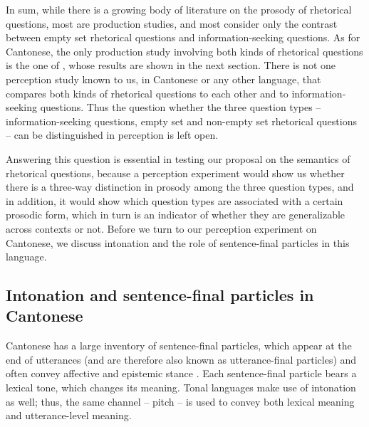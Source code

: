 \documentclass[output=paper,colorlinks,citecolor=brown            ,chinesefont]{langscibook}
\begin{document}
In sum, while there is a growing body of literature on the prosody of rhetorical questions, most are production studies, and most consider only the contrast between empty set rhetorical questions and information-seeking questions. As for Cantonese, the only production study involving both kinds of rhetorical questions is the one of \citet{Lo+2019}, whose results are shown in the next section. There is not one perception study known to us, in Cantonese or any other language, that compares both kinds of rhetorical questions to each other and to information-seeking questions. Thus the question whether the three question types -- information-seeking questions, empty set and non-empty set rhetorical questions -- can be distinguished in perception is left open. 

Answering this question is essential in testing our proposal on the semantics of rhetorical questions, because a perception experiment would show us whether there is a three-way distinction in prosody among the three question types, and in addition, it would show which question types are associated with a certain prosodic form, which in turn is an indicator of whether they are generalizable across contexts or not. Before we turn to our perception experiment on Cantonese, we discuss intonation and the role of sentence-final particles in this language.



\subsection{Intonation and sentence-final particles in Cantonese}
\largerpage
Cantonese has a large inventory of sentence-final particles, which appear at the end of utterances (and are therefore also known as utterance-final particles) and often convey affective and epistemic stance \citep{Luke1990, Matthews+2011, Sybesma+2007, Wakefield2019}. Each sentence-final particle bears a lexical tone, which changes its meaning. Tonal languages make use of intonation as well; thus, the same channel -- pitch -- is used to convey both lexical meaning and utterance-level meaning. 
\end{document}
